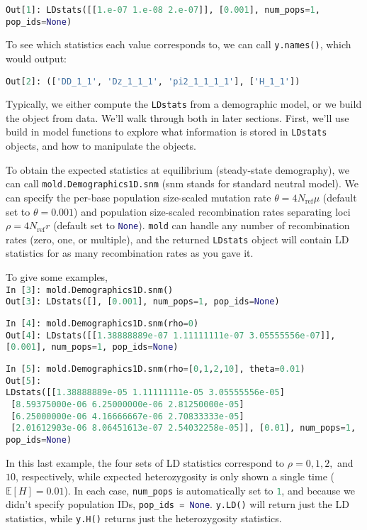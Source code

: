 \documentclass[10pt]{article}
\makeatletter
\newcommand{\mold}{\texttt{mold}\xspace}
\newcommand{\py}[1]{\lstinline[breaklines=true,language=Python, showstringspaces=False]@#1@}
\newcommand{\E}{\mathbb{E}}
\makeatother
\begin{document}
\py{Out[1]: LDstats([[1.e-07 1.e-08 2.e-07]], [0.001], num_pops=1, pop_ids=None)}

To see which statistics each value corresponds to, we can call \py{y.names()}, which would output:

\py{Out[2]: (['DD_1_1', 'Dz_1_1_1', 'pi2_1_1_1_1'], ['H_1_1'])}

Typically, we either compute the \py{LDstats} from a demographic model, or we build the object from data.
We'll walk through both in later sections.
First, we'll use build in model functions to explore what information is stored in \py{LDstats} objects, and how to manipulate the objects.

To obtain the expected statistics at equilibrium (steady-state demography), we can call \py{mold.Demographics1D.snm} (snm stands for standard neutral model).
We can specify the per-base population size-scaled mutation rate $\theta = 4N_\text{ref}\mu$ (default set to $\theta=0.001$) and population size-scaled recombination rates separating loci $\rho=4 N_\text{ref} r$ (default set to \py{None}).
\mold can handle any number of recombination rates (zero, one, or multiple), and the returned \py{LDstats} object will contain LD statistics for as many recombination rates as you gave it.

To give some examples,\\
\py{In [3]: mold.Demographics1D.snm()}\\
\py{Out[3]: LDstats([], [0.001], num_pops=1, pop_ids=None)}

\py{In [4]: mold.Demographics1D.snm(rho=0)}\\
\py{Out[4]: LDstats([[1.38888889e-07 1.11111111e-07 3.05555556e-07]], [0.001], num_pops=1, pop_ids=None)}

\py{In [5]: mold.Demographics1D.snm(rho=[0,1,2,10], theta=0.01)}\\
\py{Out[5]:}\\
\py{LDstats([[1.38888889e-05 1.11111111e-05 3.05555556e-05]}\\
\py{ [8.59375000e-06 6.25000000e-06 2.81250000e-05]}\\
\py{ [6.25000000e-06 4.16666667e-06 2.70833333e-05]}\\
\py{ [2.01612903e-06 8.06451613e-07 2.54032258e-05]], [0.01], num_pops=1, pop_ids=None)}

In this last example, the four sets of LD statistics correspond to $\rho=0,1,2,$ and $10$, respectively, while expected heterozygosity is only shown a single time ($\E[H]=0.01$).
In each case, \py{num_pops} is automatically set to \py{1}, and because we didn't specify population IDs, \py{pop_ids = None}.
\py{y.LD()} will return just the LD statistics, while \py{y.H()} returns just the heterozygosity statistics.
\end{document}
